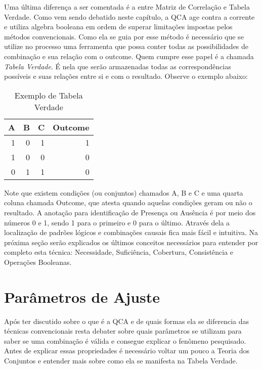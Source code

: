 \documentclass[
	12pt,				%
	oneside,			%
	a4paper,			%
	sumario=tradicional,
	english,			%
	brazil				%
	]{abntex2}
\begin{document}
Uma última diferença a ser comentada é a entre Matriz de Correlação e Tabela Verdade. Como vem sendo debatido neste capítulo, a QCA age contra a corrente e utiliza algebra booleana em ordem de superar limitações impostas pelos métodos convencionais. Como ela se guia por esse método é necessário que se utilize no processo uma ferramenta que possa conter todas as possibilidades de combinação e sua relação com o outcome. Quem cumpre esse papel é a chamada \emph{Tabela Verdade}. É nela que serão armazenadas todas as correspondências possíveis e suas relações entre si e com o resultado. Observe o exemplo abaixo:
\begin{table}[H]

\caption{\label{tab:tabverdade}Exemplo de Tabela Verdade}
\centering
\begin{tabular}[t]{rrrr}
\toprule
\textbf{A} & \textbf{B} & \textbf{C} & \textbf{Outcome}\\
\midrule
1 & 0 & 1 & 1\\
1 & 0 & 0 & 0\\
0 & 1 & 1 & 0\\
\bottomrule
\end{tabular}
\end{table}
Note que existem condições (ou conjuntos) chamados A, B e C e uma quarta coluna chamada Outcome, que atesta quando aquelas condições geram ou não o resultado. A anotação para identificação de Presença ou Ausência é por meio dos números 0 e 1, sendo 1 para o primeiro e 0 para o último. Através dela a localização de padrões lógicos e combinações causais fica mais fácil e intuitiva. Na próxima seção serão explicados os últimos conceitos necessários para entender por completo esta técnica: Necessidade, Suficiência, Cobertura, Consistência e Operações Booleanas.

\hypertarget{paruxe2metros-de-ajuste}{%
\section{Parâmetros de Ajuste}\label{paruxe2metros-de-ajuste}}

Após ter discutido sobre o que é a QCA e de quais formas ela se diferencia das técnicas convencionais resta debater sobre quais parâmetros se utilizam para saber se uma combinação é válida e consegue explicar o fenômeno pesquisado. Antes de explicar essas propriedades é necessário voltar um pouco a Teoria dos Conjuntos e entender mais sobre como ela se manifesta na Tabela Verdade.
\end{document}
